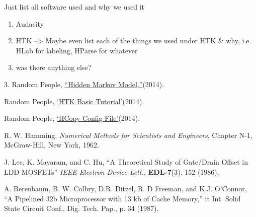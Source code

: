 \documentclass{wileySev}
\begin{document}
Just list all software used and why we used it
\begin{enumerate}
\item Audacity
\item HTK --> Maybe even list each of the things we used under HTK \& why, i.e. HLab for labeling, HParse for whatever
\item was there anything else?
\end{enumerate}


\begin{references}{3.}
Random People,
\href{http://en.wikipedia.org/wiki/Hidden_Markov_model}{``Hidden Markov Model,''}(2014).

Random People,
\href{http://www.labunix.uqam.ca/~boukadoum_m/DIC9315/Notes/Markov/HTK_basic_tutorial.pdf}{`HTK Basic Tutorial'}(2014).

Random People,
\href{http://www.voxforge.org/home/dev/acousticmodels/linux/create/htkjulius/tutorial/data-prep/step-5}{`HCopy Config File'}(2014).

R. W. Hamming,
                 {\it Numerical Methods for Scientists and 
                 Engineers}, Chapter N-1, McGraw-Hill, 
                 New York, 1962.

J. Lee, K. Mayaram, and C. Hu, ``A Theoretical
               Study of Gate/Drain Offset in LDD MOSFETs''
                     {\it IEEE Electron Device Lett.,} {\bf EDL-7}(3). 152 
                     (1986).

A. Berenbaum, 
B. W. Colbry, D.R. Ditzel, R. D Freeman, and 
K.J. O'Connor, ``A Pipelined 32b Microprocessor with 13 kb of Cache Memory,''
{it Int. Solid State Circuit Conf., Dig. Tech. Pap.,} p. 34 (1987).
\end{references}


\printindex
\end{document}
